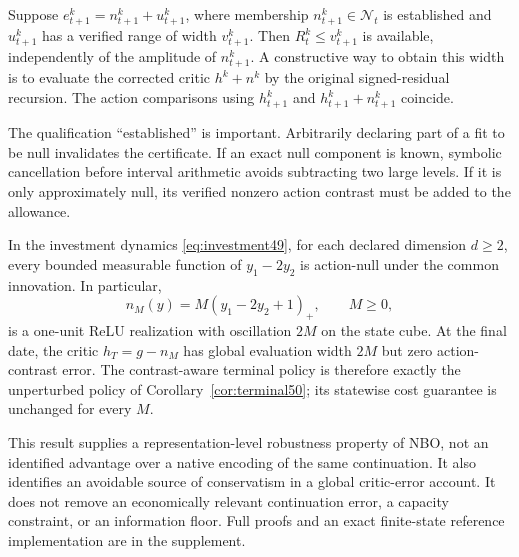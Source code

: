 \begin{corollary}\label{cor:null52}
Suppose $e_{t+1}^k=n_{t+1}^k+u_{t+1}^k$, where membership $n_{t+1}^k\in\mathcal N_t$ is established and $u_{t+1}^k$ has a verified range of width $v_{t+1}^k$. Then $R_t^k\le v_{t+1}^k$ is available, independently of the amplitude of $n_{t+1}^k$. A constructive way to obtain this width is to evaluate the corrected critic $h^k+n^k$ by the original signed-residual recursion. The action comparisons using $h_{t+1}^k$ and $h_{t+1}^k+n_{t+1}^k$ coincide.
\end{corollary}

The qualification ``established'' is important. Arbitrarily declaring part of a fit to be null invalidates the certificate. If an exact null component is known, symbolic cancellation before interval arithmetic avoids subtracting two large levels. If it is only approximately null, its verified nonzero action contrast must be added to the allowance.

\begin{proposition}\label{prop:investment-null52}
In the investment dynamics \eqref{eq:investment49}, for each declared dimension $d\ge2$, every bounded measurable function of $y_1-2y_2$ is action-null under the common innovation. In particular,
\[
 n_M(y)=M(y_1-2y_2+1)_+,\qquad M\ge0,
\]
is a one-unit ReLU realization with oscillation $2M$ on the state cube. At the final date, the critic $h_T=g-n_M$ has global evaluation width $2M$ but zero action-contrast error. The contrast-aware terminal policy is therefore exactly the unperturbed policy of Corollary~\ref{cor:terminal50}; its statewise cost guarantee is unchanged for every $M$.
\end{proposition}

This result supplies a representation-level robustness property of NBO, not an identified advantage over a native encoding of the same continuation. It also identifies an avoidable source of conservatism in a global critic-error account. It does not remove an economically relevant continuation error, a capacity constraint, or an information floor. Full proofs and an exact finite-state reference implementation are in the supplement.
